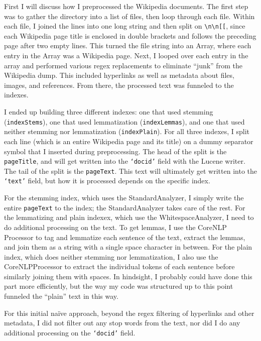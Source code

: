 \documentclass[11pt,letterpaper]{article}
\begin{document}
First I will discuss how I preprocessed the Wikipedia documents.
The first step was to gather the directory into a list of files, then loop through each file.
Within each file, I joined the lines into one long string and then split on \texttt{\textbackslash{}n\textbackslash{}n[[}, since each Wikipedia page title is enclosed in double brackets and follows the preceding page after two empty lines.
This turned the file string into an Array, where each entry in the Array was a Wikipedia page.
Next, I looped over each entry in the array and performed various regex replacements to eliminate ``junk'' from the Wikipedia dump.
This included hyperlinks as well as metadata about files, images, and references.
From there, the processed text was funneled to the indexes.


I ended up building three different indexes:  one that used stemming (\texttt{indexStems}), one that used lemmatization (\texttt{indexLemmas}), and one that used neither stemming nor lemmatization (\texttt{indexPlain}).
For all three indexes, I split each line (which is an entire Wikipedia page and its title) on a dummy separator symbol that I inserted during preprocessing.
The head of the split is the \texttt{pageTitle}, and will get written into the \texttt{`docid'} field with the Lucene writer.
The tail of the split is the \texttt{pageText}.
This text will ultimately get written into the \texttt{`text'} field, but how it is processed depends on the specific index.


For the stemming index, which uses the StandardAnalyzer, I simply write the entire \texttt{pageText} to the index; the StandardAnalyzer takes care of the rest.
For the lemmatizing and plain indexex, which use the WhitespaceAnalyzer, I need to do additional processing on the text.
To get lemmas, I use the CoreNLP Processor to tag and lemmatize each sentence of the text, extract the lemmas, and join them as a string with a single space character in between.
For the plain index, which does neither stemming nor lemmatization, I also use the CoreNLPProcessor to extract the individual tokens of each sentence before similarly joining them with spaces.
In hindsight, I probably could have done this part more efficiently, but the way my code was structured up to this point funneled the ``plain'' text in this way.

For this initial na\"ive approach, beyond the regex filtering of hyperlinks and other metadata, I did not filter out any stop words from the text, nor did I do any additional processing on the \texttt{`docid'} field.
\end{document}
